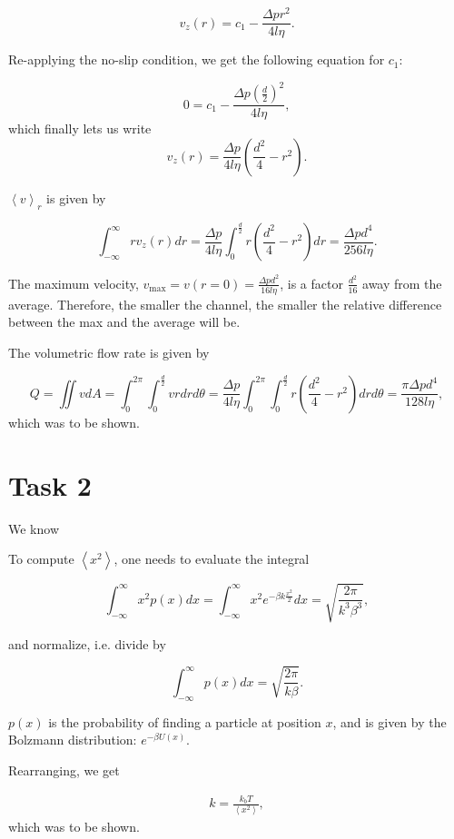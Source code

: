 \begin{equation*}
    v_z(r) = c_1 - \frac{\Delta pr^2}{4l\eta}.
\end{equation*}

Re-applying the no-slip condition, we get the following equation for $c_1$:

\begin{equation*}
    0 = c_1 - \frac{\Delta p\left(\frac{d}{2}\right)^2}{4l\eta},
\end{equation*}
which finally lets us write
\begin{equation*}
    v_z(r) = \frac{\Delta p}{4l\eta}\left(\frac{d^2}{4} - r^2\right).
\end{equation*}

$\left<v\right>_r$ is given by

\begin{equation*}
    \int_{-\infty}^\infty rv_z(r)dr = \frac{\Delta p}{4l\eta}\int_0^\frac{d}{2} r\left(\frac{d^2}{4} - r^2\right)dr = \frac{\Delta p d^4}{256l\eta}.
\end{equation*}

The maximum velocity, $v_\text{max} = v(r = 0) = \frac{\Delta p d^2}{16l\eta}$, is a factor $\frac{d^2}{16}$ away from the average. 
Therefore, the smaller the channel, the smaller the relative difference between the max and the average will be.

The volumetric flow rate is given by

\begin{equation*}
    Q = \iint v dA = \int_0^{2\pi}\int_0^\frac{d}{2} v rdrd\theta 
    = \frac{\Delta p}{4l\eta}\int_0^{2\pi} \int_0^\frac{d}{2} r\left(\frac{d^2}{4} - r^2\right)drd\theta 
    = \frac{\pi\Delta p d^4}{128l\eta},
\end{equation*}
which was to be shown. 

\section*{Task 2}

We know

To compute $\left<x^2\right>$, one needs to evaluate the integral

\begin{equation*}
    \int_{-\infty}^\infty x^2 p(x) dx = \int_{-\infty}^\infty x^2 e^{-\beta k\frac{x^2}{2}} dx = \sqrt{\frac{2\pi}{k^3\beta^3}},
\end{equation*}

and normalize, i.e. divide by 

\begin{equation*}
    \int_{-\infty}^\infty p(x) dx = \sqrt{\frac{2\pi}{k\beta}}.
\end{equation*}

$p(x)$ is the probability of finding a particle at position $x$, and is given by the Bolzmann distribution: $e^{-\beta U(x)}$.

Rearranging, we get

\begin{eqnarray}
    k = \frac{k_bT}{\left<x^2\right>},
\end{eqnarray}
which was to be shown.
